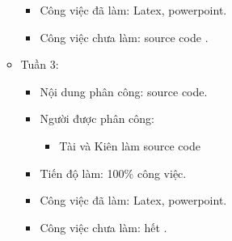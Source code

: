 \documentclass{article}
\begin{document}
\begin{itemize}
\begin{itemize}
\begin{itemize}
                    \item Công việc đã làm: Latex, powerpoint.
                    \item Công việc chưa làm: source code .
                \end{itemize}
            \item Tuần 3:
               \begin{itemize}
                    \item Nội dung phân công: source code.
                    \item Người được phân công:
                        \begin{itemize}
                            \item Tài và Kiên làm source code
                        \end{itemize}
                    \item Tiến độ làm: 100\% công việc.
                    \item Công việc đã làm: Latex, powerpoint.
                    \item Công việc chưa làm: hết .
                \end{itemize}
        \end{itemize}
        
\end{itemize}
\end{document}
